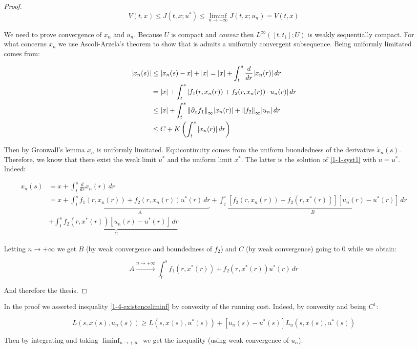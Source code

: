 \begin{theorem}
\begin{proof}
        \[V(t,x)\leq J(t,x;u^{\ast}) \leq \liminf_{n\to+\infty} J(t,x;u_n) = V(t,x)\]

        We need to prove convergence of $x_n$ and $u_n$. Because $U$ is compact and \textit{convex} then $L^{\infty}([t,t_1];U)$ is 
        weakly sequentially compact. For what concerns $x_n$ we use Ascoli-Arzela's theorem to show that is admits a uniformly convergent subsequence. Being 
        uniformly limitated comes from:

        \begin{align}
            \abs{x_n(s)} & \leq \abs{x_n(s)-x}+\abs{x} = \abs{x} + \int_t^s \frac{d}{dr}\abs{x_n(r)} \,dr \\
            & = \abs{x} + \int_t^s \abs{f_1(r,x_n(r)) + f_2(r,x_n(r))\cdot u_n(r)}\,dr \\
            & \leq \abs{x} + \int_t^s \norm{\partial_xf_1}_{\infty}\abs{x_n(r)} + \norm{f_2}_{\infty}\abs{u_n} \,dr \\
            & \leq C + K\left( \int_t^s \abs{x_n(r)} \,dr \right)   
        \end{align}

        Then by Gronwall's lemma $x_n$ is uniformly limitated. Equicontinuity comes from the uniform buondedness of the
        derivative $\dot{x}_n(s)$. Therefore, we know that there exist the weak limit $u^{\ast}$ and the uniform
        limit $x^{\ast}$. The latter is the solution of \ref{1-1-syst1} with $u=u^{\ast}$. Indeed:

        \begin{align*}
                x_n(s) & = x + \int_t^s\frac{d}{dr}x_n(r) \,dr\\
                & = x + \underbrace{\int_t^sf_1(r,x_n(r)) + f_2(r,x_n(r))u^{\ast}(r) \,dr}_{A} + \underbrace{\int_t^s \left[f_2(r,x_n(r)) - f_2(r,x^{\ast}(r))\right]\left[u_n(r)-u^{\ast}(r)\right] \,dr}_{B} \\
                & + \underbrace{\int_t^s f_2(r,x^{\ast}(r))\left[u_n(r)-u^{\ast}(r)\right] \,dr}_{C}
        \end{align*}
        
        Letting $n\to+\infty$ we get $B$ (by weak convergence and boundedness of $f_2$) and $C$ (by weak convergence) going to $0$ 
        while we obtain:

        \[A\xrightarrow{n\to+\infty}\int_t^sf_1(r,x^{\ast}(r))+f_2(r,x^{\ast}(r))u^{\ast}(r)\,dr\]
        
        And therefore the thesis.
    \end{proof}
\end{theorem}


\begin{remark}\label{1-4-reamrkconvexity}
    In the proof we asserted inequality \ref{1-4-existenceliminf} by convexity of the running cost. Indeed, 
    by convexity and being $C^1$:

    \[L(s,x(s),u_n(s)) \geq L(s,x(s),u^{\ast}(s)) + \left[u_n(s) - u^{\ast}(s)\right]L_u(s,x(s),u^{\ast}(s))\]

    Then by integrating and taking $\liminf_{n\to+\infty}$ we get the inequality (using weak convergence of $u_n$). 
\end{remark}